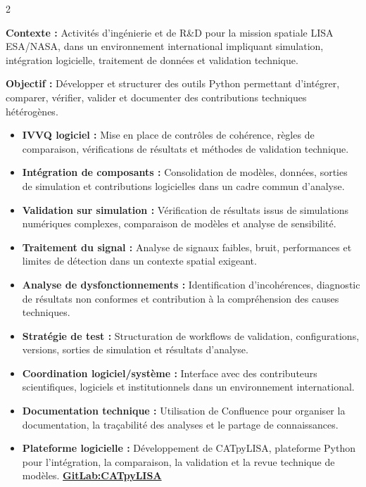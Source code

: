 \documentclass[8pt,a4paper,ragged2e,withhyper]{../_shared/altacv}
\begin{document}
\begin{paracol}{2}
\divider


\textbf{Contexte :} Activités d’ingénierie et de R\&D pour la mission spatiale LISA ESA/NASA, dans un environnement international impliquant simulation, intégration logicielle, traitement de données et validation technique.

\textbf{Objectif :} Développer et structurer des outils Python permettant d’intégrer, comparer, vérifier, valider et documenter des contributions techniques hétérogènes.

\begin{itemize}
  \item \textbf{IVVQ logiciel :} Mise en place de contrôles de cohérence, règles de comparaison, vérifications de résultats et méthodes de validation technique.
  \item \textbf{Intégration de composants :} Consolidation de modèles, données, sorties de simulation et contributions logicielles dans un cadre commun d’analyse.
  \item \textbf{Validation sur simulation :} Vérification de résultats issus de simulations numériques complexes, comparaison de modèles et analyse de sensibilité.
  \item \textbf{Traitement du signal :} Analyse de signaux faibles, bruit, performances et limites de détection dans un contexte spatial exigeant.
  \item \textbf{Analyse de dysfonctionnements :} Identification d’incohérences, diagnostic de résultats non conformes et contribution à la compréhension des causes techniques.
  \item \textbf{Stratégie de test :} Structuration de workflows de validation, configurations, versions, sorties de simulation et résultats d’analyse.
  \item \textbf{Coordination logiciel/système :} Interface avec des contributeurs scientifiques, logiciels et institutionnels dans un environnement international.
  \item \textbf{Documentation technique :} Utilisation de Confluence pour organiser la documentation, la traçabilité des analyses et le partage de connaissances.
  \item \textbf{Plateforme logicielle :} Développement de CATpyLISA, plateforme Python pour l’intégration, la comparaison, la validation et la revue technique de modèles.
  \textcolor{DarkPastelRed}{\href{https://gitlab.oca.eu/gboileau/lisa_l3_tools}{\bf GitLab:CATpyLISA}}
\end{itemize}


\end{paracol}
\end{document}
